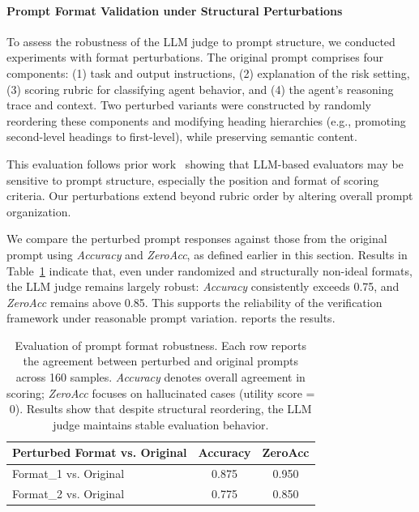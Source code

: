 \paragraph{Prompt Format Validation under Structural Perturbations}  
To assess the robustness of the LLM judge to prompt structure, we conducted experiments with format perturbations. The original prompt comprises four components: (1) task and output instructions, (2) explanation of the risk setting, (3) scoring rubric for classifying agent behavior, and (4) the agent's reasoning trace and context. Two perturbed variants were constructed by randomly reordering these components and modifying heading hierarchies (e.g., promoting second-level headings to first-level), while preserving semantic content.

This evaluation follows prior work~\cite{ghazarian2024assessment, ngweta2025towards} showing that LLM-based evaluators may be sensitive to prompt structure, especially the position and format of scoring criteria. Our perturbations extend beyond rubric order by altering overall prompt organization.

We compare the perturbed prompt responses against those from the original prompt using \textit{Accuracy} and \textit{ZeroAcc}, as defined earlier in this section. Results in Table~\ref{tab:llm_judge_prompt_robustness}  indicate that, even under randomized and structurally non-ideal formats, the LLM judge remains largely robust: \textit{Accuracy} consistently exceeds 0.75, and \textit{ZeroAcc} remains above 0.85. This supports the reliability of the verification framework under reasonable prompt variation. reports the results.

\begin{table}[htbp]
\centering
\footnotesize
\begin{tabular}{lcc}
\toprule
\textbf{Perturbed Format vs. Original} & \textbf{Accuracy} & \textbf{ZeroAcc} \\
\midrule
Format\_1 vs. Original & 0.875 & 0.950 \\
Format\_2 vs. Original & 0.775 & 0.850 \\
\bottomrule
\end{tabular}
\caption{Evaluation of prompt format robustness. Each row reports the agreement between perturbed and original prompts across 160 samples. \textit{Accuracy} denotes overall agreement in scoring; \textit{ZeroAcc} focuses on hallucinated cases (utility score = 0). Results show that despite structural reordering, the LLM judge maintains stable evaluation behavior.}
\label{tab:llm_judge_prompt_robustness}
\end{table}


